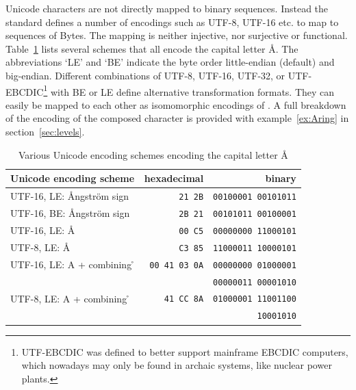 Unicode characters are not directly mapped to binary sequences. Instead the
standard defines a number of encodings such as UTF-8, UTF-16 etc. to map
 to sequences of Bytes. The mapping is neither injective, nor
surjective or functional. Table~\ref{tab:utfaringencodings} lists several
schemes that all encode the capital letter \r{A}. The abbreviations `LE' and
`BE' indicate the byte order little-endian (default) and big-endian.  Different
combinations of UTF-8, UTF-16, UTF-32, or UTF-EBCDIC\footnote{UTF-EBCDIC was
defined to better support mainframe EBCDIC computers, which nowadays may only
be found in archaic systems, like nuclear power plants.} with BE or LE define
alternative transformation formats.  They can easily be mapped to each other as
isomomorphic encodings of . A full breakdown of the encoding of the
composed character is provided with example~\ref{ex:Aring} in
section~\ref{sec:levels}.


\begin{table}[h]
\centering
\begin{tabular}{l|r|r}
 \textbf{Unicode encoding scheme} & \textbf{hexadecimal} & \textbf{binary} \\
\hline
 UTF-16, LE: \r{A}ngstr\"{o}m sign & \verb|21 2B| 
& \verb|00100001 00101011| \\
\hline
 UTF-16, BE: \r{A}ngstr\"{o}m sign & \verb|2B 21|
& \verb|00101011 00100001| \\
\hline
 UTF-16, LE: \r{A} & \verb|00 C5|
& \verb|00000000 11000101| \\
\hline
 UTF-8, LE: \r{A} & \verb|C3 85|
& \verb|11000011 10000101| \\
\hline
 UTF-16, LE: A + combining \r{} & \verb|00 41 03 0A| 
& \verb|00000000 01000001| \\
& & \verb|00000011 00001010| \\
\hline
 UTF-8, LE: A + combining \r{} & \verb|41 CC 8A| 
& \verb|01000001 11001100| \\ & &  \verb|10001010| \\
\end{tabular}
\caption{Various Unicode encoding schemes encoding the capital letter \r{A}}
\label{tab:utfaringencodings}
\end{table}

